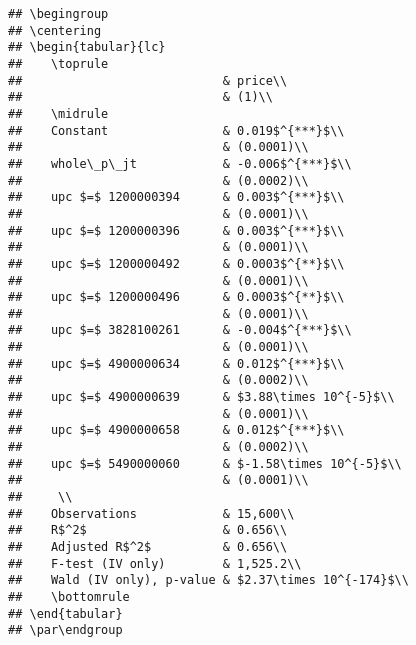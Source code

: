 \documentclass[
]{article}
\begin{document}
\begin{verbatim}
## \begingroup
## \centering
## \begin{tabular}{lc}
##    \toprule
##                            & price\\  
##                            & (1)\\  
##    \midrule 
##    Constant                & 0.019$^{***}$\\   
##                            & (0.0001)\\   
##    whole\_p\_jt            & -0.006$^{***}$\\   
##                            & (0.0002)\\   
##    upc $=$ 1200000394      & 0.003$^{***}$\\   
##                            & (0.0001)\\   
##    upc $=$ 1200000396      & 0.003$^{***}$\\   
##                            & (0.0001)\\   
##    upc $=$ 1200000492      & 0.0003$^{**}$\\   
##                            & (0.0001)\\   
##    upc $=$ 1200000496      & 0.0003$^{**}$\\   
##                            & (0.0001)\\   
##    upc $=$ 3828100261      & -0.004$^{***}$\\   
##                            & (0.0001)\\   
##    upc $=$ 4900000634      & 0.012$^{***}$\\   
##                            & (0.0002)\\   
##    upc $=$ 4900000639      & $3.88\times 10^{-5}$\\    
##                            & (0.0001)\\   
##    upc $=$ 4900000658      & 0.012$^{***}$\\   
##                            & (0.0002)\\   
##    upc $=$ 5490000060      & $-1.58\times 10^{-5}$\\    
##                            & (0.0001)\\   
##     \\
##    Observations            & 15,600\\  
##    R$^2$                   & 0.656\\  
##    Adjusted R$^2$          & 0.656\\  
##    F-test (IV only)        & 1,525.2\\  
##    Wald (IV only), p-value & $2.37\times 10^{-174}$\\   
##    \bottomrule
## \end{tabular}
## \par\endgroup
\end{verbatim}
\end{document}
